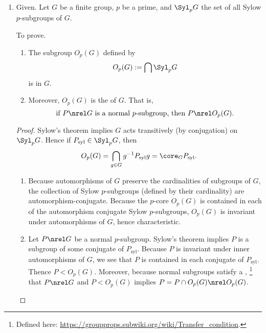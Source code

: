 \documentclass[onesided]{ccg-pset}
\begin{document}
\begin{enumerate}
\item Given. Let $G$ be a finite group, $p$ be a prime, and $\Syl_p G$ the set of all Sylow $p$-subgroups of $G$.

    To prove. 
    \begin{enumerate}
        \item The subgroup $O_p(G)$ defined by 
          \begin{equation}
              \label{def-o-p}
              O_p(G) := \bigcap \Syl_p G
          \end{equation}
              is  in $G$.
          \item Moreover, $O_p(G)$ is the  of $G$. That is, 
              \begin{equation}
                  \text{if $P \nrel G$ is a normal $p$-subgroup, then $P \nrel O_p(G)$.}
              \end{equation}
    \end{enumerate}

    \begin{proof}
        Sylow's theorem implies $G$ acts transitively (by conjugation) on $\Syl_p G$. Hence if $P_\text{syl} \in \Syl_p G$, then 
        \begin{equation*}
            O_p(G) = \bigcap_{g \in G}g^{-1} P_\text{syl} g = \core_G P_\text{syl}.
        \end{equation*}
        \begin{enumerate}
            \item  Because automorphisms of $G$ preserve the cardinalities of subgroups of $G$, the collection of Sylow $p$-subgroups (defined by their cardinality) are automorphism-conjugate. Because the $p$-core $O_p(G)$ is contained in each of the automorphism conjugate Sylow $p$-subgroups, $O_p(G)$ is invariant under automorphisms of $G$, hence characteristic. 
                  
            \item Let $P \nrel G$ be a normal $p$-subgroup. Sylow's theorem implies $P$ is a subgroup of some conjugate of $P_\text{syl}$. Because $P$ is invariant under inner automorphisms of $G$, we see that $P$ is contained in each conjugate of $P_\text{syl}$. Thence $P < O_p(G)$. Moreover, because normal subgroups satisfy a ,%
                        \footnote{%
                            Defined here: \url{https://groupprops.subwiki.org/wiki/Transfer_condition}.
                        }
                    that $P \nrel G$ and $P < O_p(G)$ implies $P = P \cap O_p(G) \nrel O_p(G)$.
        \end{enumerate}
    \end{proof}


\end{enumerate}
\end{document}
